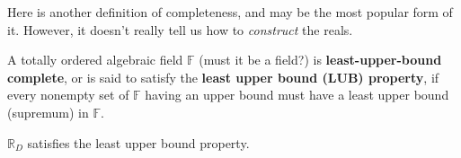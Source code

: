   Here is another definition of completeness, and may be the most popular form of it. However, it doesn't really tell us how to \textit{construct} the reals. 

  \begin{definition}
    A totally ordered algebraic field $\mathbb{F}$ (must it be a field?) is \textbf{least-upper-bound complete}, or is said to satisfy the \textbf{least upper bound (LUB) property}, if every nonempty set of $\mathbb{F}$ having an upper bound must have a least upper bound (supremum) in $\mathbb{F}$. 
  \end{definition} 

  \begin{theorem}
    $\mathbb{R}_D$ satisfies the least upper bound property. 
  \end{theorem}
